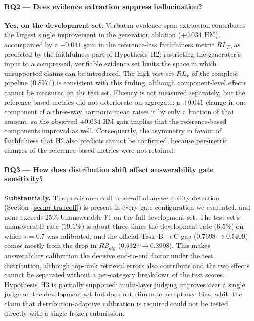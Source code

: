 \paragraph{RQ2 --- Does evidence extraction suppress hallucination?}
\textbf{Yes, on the development set.} Verbatim evidence span extraction contributes the largest single improvement in the generation ablation ($+0.034$ HM), accompanied by a $+0.041$ gain in the reference-less faithfulness metric $RL_F$, as predicted by the faithfulness part of Hypothesis~H2: restricting the generator's input to a compressed, verifiable evidence set limits the space in which unsupported claims can be introduced. The high test-set $RL_F$ of the complete pipeline ($0.8971$) is consistent with this finding, although component-level effects cannot be measured on the test set. Fluency is not measured separately, but the reference-based metrics did not deteriorate on aggregate: a $+0.041$ change in one component of a three-way harmonic mean raises it by only a fraction of that amount, so the observed $+0.034$ HM gain implies that the reference-based components improved as well. Consequently, the asymmetry in favour of faithfulness that H2 also predicts cannot be confirmed, because per-metric changes of the reference-based metrics were not retained.

\paragraph{RQ3 --- How does distribution shift affect answerability gate sensitivity?}
\textbf{Substantially.} The precision--recall trade-off of answerability detection (Section~\ref{sec:pr-tradeoff}) is present in every gate configuration we evaluated, and none exceeds $25\%$ Unanswerable F1 on the full development set. The test set's unanswerable rate ($19.1\%$) is about three times the development rate ($6.5\%$) on which $\tau{=}0.7$ was calibrated, and the official Task~B$\rightarrow$C gap ($0.7698 \rightarrow 0.5409$) comes mostly from the drop in $RB_{alg}$ ($0.6327 \rightarrow 0.3998$). This makes answerability calibration the decisive end-to-end factor under the test distribution, although top-rank retrieval errors also contribute and the two effects cannot be separated without a per-category breakdown of the test scores. Hypothesis~H3 is partially supported: multi-layer judging improves over a single judge on the development set but does not eliminate acceptance bias, while the claim that distribution-adaptive calibration is required could not be tested directly with a single frozen submission.

